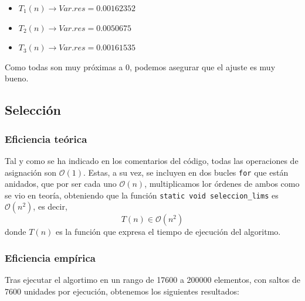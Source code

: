 \documentclass[10pt,a4paper]{article}
\begin{document}
\begin{itemize}
	\item \(T_1(n) \longrightarrow Var.res = 0.00162352\)
	\item \(T_2(n) \longrightarrow Var.res = 0.0050675\)
	\item \(T_3(n) \longrightarrow Var.res = 0.00161535\)
\end{itemize}

Como todas son muy próximas a 0, podemos asegurar que el ajuste es muy bueno.

\subsection{Selección}


\subsubsection{Eficiencia teórica}
Tal y como se ha indicado en los comentarios del código, todas las operaciones de asignación son \(\mathcal{O}(1)\). Estas, a su vez, se incluyen en dos bucles \texttt{for} que están anidados, que por ser cada uno \(\mathcal{O}(n)\), multiplicamos lor órdenes de ambos como se vio en teoría, obteniendo que la función \texttt{static void seleccion\_lims} es \(\mathcal{O}(n^2)\), es decir,
\[
T(n) \in \mathcal{O}(n^2)
\]
donde \(T(n)\) es la función que expresa el tiempo de ejecución del algoritmo.

\subsubsection{Eficiencia empírica}
Tras ejecutar el algortimo en un rango de 17600 a 200000 elementos, con saltos de 7600 unidades por ejecución, obtenemos los siguientes resultados:
\end{document}
